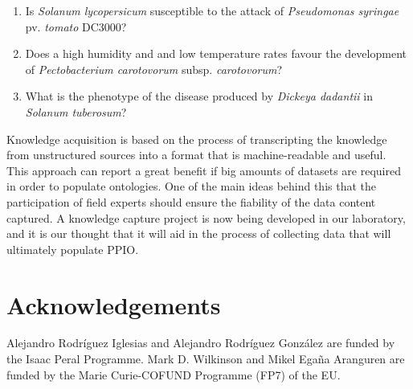\documentclass[sw]{iosart2c}
\begin{document}
\begin{enumerate}
\item Is {\itshape Solanum lycopersicum} susceptible to the attack of {\itshape Pseudomonas syringae} pv. {\itshape tomato} DC3000?
\item Does a high humidity and and low temperature rates favour the development of {\itshape Pectobacterium carotovorum} subsp. {\itshape carotovorum}?
\item What is the phenotype of the disease produced by {\itshape Dickeya dadantii} in {\itshape Solanum tuberosum}?

\end{enumerate}

Knowledge acquisition is based on the process of transcripting the knowledge from unstructured sources into a format that is machine-readable and useful. This approach can report a great benefit if big amounts of datasets are required in order to populate ontologies. One of the main ideas behind this that the participation of field experts should ensure the fiability of the data content captured. A knowledge capture project is now being developed in our laboratory, and it is our thought that it will aid in the process of collecting data that will ultimately populate PPIO.

\section*{Acknowledgements}
Alejandro Rodr\'iguez Iglesias and Alejandro Rodr\'iguez Gonz\'alez are funded by the Isaac Peral Programme. Mark D. Wilkinson and Mikel Ega\~na Aranguren are funded by the Marie Curie-COFUND Programme (FP7) of the EU.











  
\end{document}
